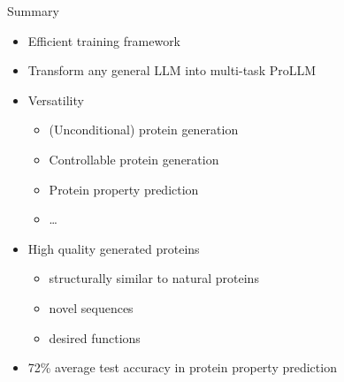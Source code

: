 \begin{frame}{Summary}
	\begin{itemize}\setlength\itemsep{1em}
			\item Efficient training framework
			\item Transform any general LLM into multi-task ProLLM
			\item Versatility
			\begin{itemize}
					\item (Unconditional) protein generation
					\item Controllable protein generation
					\item Protein property prediction
					\item \dots
			\end{itemize}
			\item High quality generated proteins
			\begin{itemize}
				\item structurally similar to natural proteins 
				\item novel sequences
				\item desired functions
			\end{itemize}
			\item 72\% average test accuracy in protein property prediction
		\end{itemize}
\end{frame}
